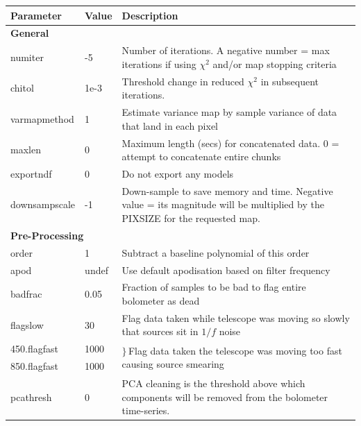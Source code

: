 \documentclass[twoside,11pt]{article}
\newenvironment{latexonly}{}{}
\renewcommand{\_}{\texttt{\symbol{95}}}
\begin{document}
\begin{latexonly}
\renewcommand*\arraystretch{0.85}
\begin{table}
\begin{center}
\begin{footnotesize}
\begin{tabular}{|p{2.2cm}|p{1.1cm}|p{11.4cm}|}
\hline
Parameter & Value & Description \\
\hline
\multicolumn{3}{|l|}{\textbf{General}}\\
\hline
numiter       &   -5 & Number of iterations. A negative number = max iterations
                       if using $\chi^2$ and/or map stopping criteria\\
chitol        & 1e-3 & Threshold change in reduced $\chi^2$ in subsequent
                       iterations.\\
varmapmethod  &    1 & Estimate variance map by sample variance of data that
                       land in each pixel\\
maxlen        &    0 & Maximum length (secs) for concatenated data. 0 = attempt
                       to concatenate entire chunks\\
exportndf     &    0 & Do not export any models\\
downsampscale &   -1 & Down-sample to save memory and time. Negative value = its
                       magnitude will be multiplied by the PIXSIZE for the
                       requested map.\\
\hline
\multicolumn{3}{|l|}{\textbf{Pre-Processing}}\\
\hline
order         &    1  & Subtract a baseline polynomial of this order\\
apod          & undef & Use default apodisation based on filter frequency\\
badfrac       & 0.05  & Fraction of samples to be bad to flag entire bolometer
                        as dead\\
flagslow      &    30 & Flag data taken while telescope was moving so slowly
                        that sources sit in $1/f$ noise\\
450.flagfast  &  1000 & \multirow{2}{*}{{\large$\rbrace$}\,Flag data taken
                        the telescope was moving too fast causing source
                        smearing}\\
850.flagfast  &  1000 & \\
pcathresh     &     0 & PCA cleaning is the threshold above which components
                        will be removed from the bolometer time-series.\\

\end{tabular}
\end{footnotesize}
\end{center}
\end{table}
\end{latexonly}
\end{document}
